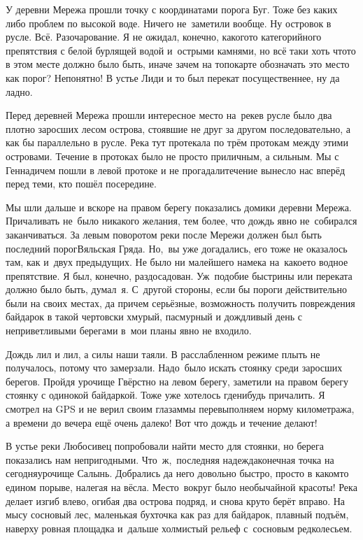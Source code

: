 У деревни Мережа прошли точку с координатами порога Буг. Тоже без каких либо проблем по высокой воде. Ничего не~заметили вообще. Ну островок в русле. Всё. Разочарование. Я не ожидал, конечно, какого\sdash то категорийного препятствия с белой бурлящей водой и~острыми камнями, но всё таки хоть что\sdash то в этом месте должно было быть, иначе зачем на топокарте обозначать это место как порог? Непонятно! В устье Лиди и то был перекат посущественнее, ну да ладно. 

Перед деревней Мережа прошли интересное место на~реке\mdash в русле было два плотно заросших лесом острова, стоявшие не друг за другом последовательно, а как бы параллельно в русле. Река тут протекала по трём протокам между этими островами. Течение в протоках было не просто приличным, а сильным. Мы с Геннадичем пошли в левой протоке и не прогадали\mdash течение вынесло нас вперёд перед теми, кто пошёл посередине.

Мы шли дальше и вскоре на правом берегу показались домики деревни Мережа. Причаливать не~было никакого желания, тем более, что дождь явно не~собирался заканчиваться. За левым поворотом реки после Мережи должен был быть последний порог\mdash Вяльская Гряда. Но,~вы уже догадались, его тоже не оказалось там, как и~двух предыдущих. Не было ни малейшего намека на~какое\sdash то водное препятствие. Я был, конечно, раздосадован. Уж~подобие быстрины или переката должно было быть, думал~я. С~другой стороны, если бы пороги действительно были на своих местах, да причем серьёзные, возможность получить повреждения байдарок в такой чертовски хмурый, пасмурный и дождливый день с неприветливыми берегами в~мои планы явно не входило.

Дождь лил и лил, а силы наши таяли. В расслабленном режиме плыть не получалось, потому что замерзали. Надо~было искать стоянку среди заросших берегов. Пройдя урочище Гвёрстно на левом берегу, заметили на правом берегу стоянку с одинокой байдаркой. Тоже уже хотелось где\sdash нибудь причалить. Я смотрел на GPS и не верил своим глазам\mdash мы перевыполняем норму километража, а времени до вечера ещё очень далеко! Вот что дождь и течение делают! 

В устье реки Любосивец попробовали найти место для стоянки, но берега показались нам непригодными. Что~ж,~последняя надежда\mdash конечная точка на сегодня\mdash урочище Салынь. Добрались да него довольно быстро, просто в каком\sdash то едином порыве, налегая на вёсла. Место~вокруг было необычайной красоты! Река делает изгиб влево, огибая два острова подряд, и снова круто берёт вправо. На мысу сосновый лес, маленькая бухточка как раз для байдарок, плавный подъём, наверху ровная площадка и~дальше холмистый рельеф с~сосновым редколесьем. 

